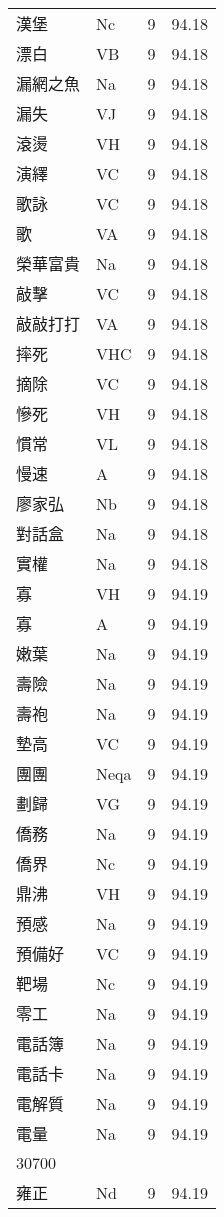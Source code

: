 \documentclass[twocolumn]{book}
\begin{document}
\begin{supertabular}{llrr}
漢堡 & Nc & 9 &  94.18\\
漂白 & VB & 9 &  94.18\\
漏網之魚 & Na & 9 &  94.18\\
漏失 & VJ & 9 &  94.18\\
滾燙 & VH & 9 &  94.18\\
演繹 & VC & 9 &  94.18\\
歌詠 & VC & 9 &  94.18\\
歌 & VA & 9 &  94.18\\
榮華富貴 & Na & 9 &  94.18\\
敲擊 & VC & 9 &  94.18\\
敲敲打打 & VA & 9 &  94.18\\
摔死 & VHC & 9 &  94.18\\
摘除 & VC & 9 &  94.18\\
慘死 & VH & 9 &  94.18\\
慣常 & VL & 9 &  94.18\\
慢速 & A & 9 &  94.18\\
廖家弘 & Nb & 9 &  94.18\\
對話盒 & Na & 9 &  94.18\\
實權 & Na & 9 &  94.18\\
寡 & VH & 9 &  94.19\\
寡 & A & 9 &  94.19\\
嫩葉 & Na & 9 &  94.19\\
壽險 & Na & 9 &  94.19\\
壽袍 & Na & 9 &  94.19\\
墊高 & VC & 9 &  94.19\\
團團 & Neqa & 9 &  94.19\\
劃歸 & VG & 9 &  94.19\\
僑務 & Na & 9 &  94.19\\
僑界 & Nc & 9 &  94.19\\
鼎沸 & VH & 9 &  94.19\\
預感 & Na & 9 &  94.19\\
預備好 & VC & 9 &  94.19\\
靶場 & Nc & 9 &  94.19\\
零工 & Na & 9 &  94.19\\
電話簿 & Na & 9 &  94.19\\
電話卡 & Na & 9 &  94.19\\
電解質 & Na & 9 &  94.19\\
電量 & Na & 9 &  94.19\\
30700\\
雍正 & Nd & 9 &  94.19\\

\end{supertabular}
\end{document}
